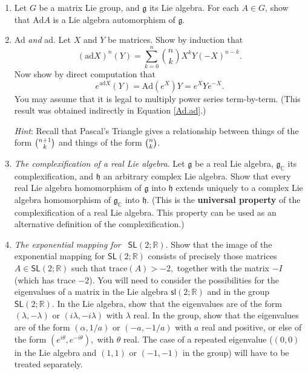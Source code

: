 \documentclass[12pt]{amsbook}
\let \frak = \mathfrak
\theoremstyle{plain}
\numberwithin{equation}{chapter}
\numberwithin{theorem}{chapter}
\begin{document}
\begin{enumerate}
\item  Let $G$ be a matrix Lie group, and $\frak{g}$ its Lie algebra. For each
$A\in G$, show that $\mathrm{Ad}A$ is a Lie algebra automorphism of $\frak{g}$.

\item \label{ad.expand}Ad \textit{and} ad. Let $X$ and $Y$ be matrices. Show
by induction that
\[
\left(  \mathrm{ad}X\right)  ^{n}(Y)=\sum_{k=0}^{n}\binom{n}{k}X^{k}%
Y(-X)^{n-k}\text{.}%
\]
Now show by direct computation that
\[
e^{\mathrm{ad}X}(Y)=\mathrm{Ad}(e^{X})Y=e^{X}Ye^{-X}\text{.}%
\]
You may assume that it is legal to multiply power series term-by-term. (This
result was obtained indirectly in Equation \ref{Ad.ad}.)

\textit{Hint}: Recall that Pascal's Triangle gives a relationship between
things of the form $\tbinom{n+1}{k}$ and things of the form $\tbinom{n}{k}$.

\item \label{extend.lie.homo}\textit{The complexification of a real Lie
algebra}. Let $\frak{g}$ be a real Lie algebra, $\frak{g}_{\mathbb{C}}$ its
complexification, and $\frak{h}$ an arbitrary complex Lie algebra. Show that
every real Lie algebra homomorphism of $\frak{g}$ into $\frak{h}$ extends
uniquely to a complex Lie algebra homomorphism of $\frak{g}_{\mathbb{C}}$ into
$\frak{h}$. (This is the \textbf{universal property} of the complexification
of a real Lie algebra. This property can be used as an alternative definition
of the complexification.)

\item \label{exp.sl2}\textit{The exponential mapping for}\emph{\ }%
$\mathsf{SL}\left(  2;\mathbb{R}\right)  $. Show that the image of the
exponential mapping for $\mathsf{SL}\left(  2;\mathbb{R}\right)  $ consists of
precisely those matrices $A\in\mathsf{SL}\left(  2;\mathbb{R}\right)  $ such
that $\mathrm{trace}\left(  A\right)  >-2,$ together with the matrix $-I$
(which has trace $-2$). You will need to consider the possibilities for the
eigenvalues of a matrix in the Lie algebra $\mathsf{sl}\left(  2;\mathbb{R}%
\right)  $ and in the group $\mathsf{SL}\left(  2;\mathbb{R}\right)  $. In the
Lie algebra, show that the eigenvalues are of the form $\left(  \lambda
,-\lambda\right)  $ or $\left(  i\lambda,-i\lambda\right)  $ with $\lambda$
real. In the group, show that the eigenvalues are of the form $\left(
\alpha,1/a\right)  $ or $\left(  -a,-1/a\right)  $ with $a$ real and positive,
or else of the form $\left(  e^{i\theta},e^{-i\theta}\right)  ,$ with $\theta$
real. The case of a repeated eigenvalue ($\left(  0,0\right)  $ in the Lie
algebra and $\left(  1,1\right)  $ or $\left(  -1,-1\right)  $ in the group)
will have to be treated separately.


\end{enumerate}
\end{document}
